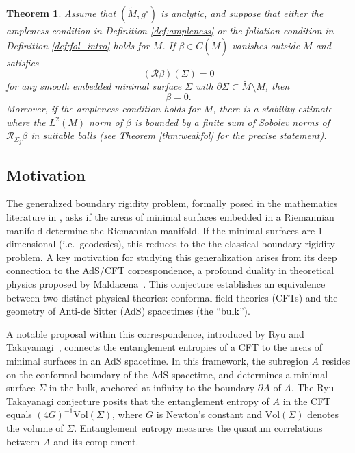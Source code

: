 \documentclass[11pt]{amsart}
\newtheorem{Theorem}{Theorem}[section]
\theoremstyle{definition}
\numberwithin{equation}{section}
\newcommand{\p}{\partial}
\begin{document}
\begin{Theorem}\label{thm:integral_transform_uniqueness}
	Assume that $(\widetilde M,{g^\circ})$ is analytic, and suppose that either the ampleness condition in Definition \ref{def:ampleness} or the foliation condition in Definition \ref{def:fol_intro} holds for $M$. If $\beta \in C(\widetilde{M})$ vanishes outside $M$ and satisfies 
	\[
	 (\mathcal{R} \beta)(\Sigma) = 0
	\] 
    for any smooth embedded minimal surface $\Sigma$ with $\p \Sigma \subset \widetilde{M} \setminus M$, then  
\[
\beta = 0.
\]
Moreover, if the ampleness condition holds for $M$, there is a stability estimate where the $L^2(M)$ norm of $\beta$ is bounded by a finite sum of Sobolev norms of $\mathcal{R}_{\Sigma_j} \beta$ in suitable balls (see Theorem \ref{thm:weakfol} for the precise statement).
\end{Theorem}













\subsection{Motivation}
The generalized boundary rigidity problem, formally posed in the mathematics literature in \cite{Tracey}, asks if the areas of minimal surfaces embedded
in a Riemannian manifold determine the Riemannian manifold. If
the minimal surfaces are 1-dimensional (i.e.\ geodesics), this reduces to the the classical boundary rigidity problem.  A key motivation for studying this
generalization arises from its deep connection to 
the AdS/CFT correspondence, a profound duality in theoretical physics proposed by Maldacena~\cite{maldacena1999large}. This conjecture establishes an equivalence between two distinct physical theories: conformal field theories (CFTs) and the geometry of Anti-de Sitter (AdS) spacetimes (the ``bulk''). %


A notable proposal within this correspondence, introduced by Ryu and Takayanagi~\cite{ryu2006holographic,ryu2006aspects}, connects the entanglement entropies of a CFT to the areas of minimal surfaces in an AdS spacetime.  In this framework, the subregion $A$ resides on the conformal boundary of the AdS spacetime,
 and determines a minimal surface $\Sigma$ in the bulk, anchored at infinity to the boundary $\partial A$ of $A$. The Ryu-Takayanagi conjecture posits that the entanglement entropy of $A$ in the CFT equals $(4G)^{-1} \text{Vol}(\Sigma)$, where $G$ is Newton's constant and $\text{Vol}(\Sigma)$ denotes the volume of $\Sigma$. Entanglement entropy measures the quantum correlations between $A$ and its complement. 
 
\end{document}

